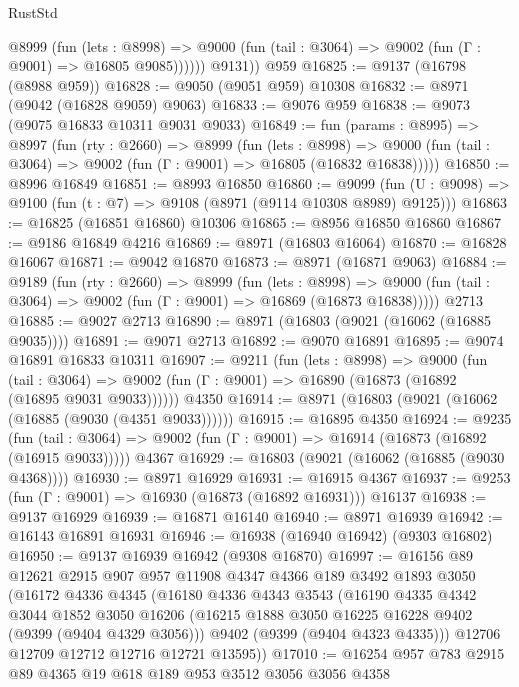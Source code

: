 \begin{lexlean}{RustStd}
\begin{coremodule}
            @8999
              (fun (lets : @8998) =>
              @9000 (fun (tail : @3064) => @9002 (fun (Γ : @9001) => @16805 @9085))))))
        @9131))
    @959
@16825 := @9137 (@16798 (@8988 @959))
@16828 := @9050 (@9051 @959) @10308
@16832 := @8971 (@9042 (@16828 @9059) @9063)
@16833 := @9076 @959
@16838 := @9073 (@9075 @16833 @10311 @9031 @9033)
@16849 := fun (params : @8995) =>
  @8997
    (fun (rty : @2660) =>
    @8999
      (fun (lets : @8998) =>
      @9000 (fun (tail : @3064) => @9002 (fun (Γ : @9001) => @16805 (@16832 @16838)))))
@16850 := @8996 @16849
@16851 := @8993 @16850
@16860 := @9099
    (fun (U : @9098) => @9100 (fun (t : @7) => @9108 (@8971 (@9114 @10308 @8989) @9125)))
@16863 := @16825 (@16851 @16860) @10306
@16865 := @8956 @16850 @16860
@16867 := @9186 @16849 @4216
@16869 := @8971 (@16803 @16064)
@16870 := @16828 @16067
@16871 := @9042 @16870
@16873 := @8971 (@16871 @9063)
@16884 := @9189
    (fun (rty : @2660) =>
    @8999
      (fun (lets : @8998) =>
      @9000 (fun (tail : @3064) => @9002 (fun (Γ : @9001) => @16869 (@16873 @16838)))))
    @2713
@16885 := @9027 @2713
@16890 := @8971 (@16803 (@9021 (@16062 (@16885 @9035))))
@16891 := @9071 @2713
@16892 := @9070 @16891
@16895 := @9074 @16891 @16833 @10311
@16907 := @9211
    (fun (lets : @8998) =>
    @9000
      (fun (tail : @3064) =>
      @9002 (fun (Γ : @9001) => @16890 (@16873 (@16892 (@16895 @9031 @9033))))))
    @4350
@16914 := @8971 (@16803 (@9021 (@16062 (@16885 (@9030 (@4351 @9033))))))
@16915 := @16895 @4350
@16924 := @9235
    (fun (tail : @3064) => @9002 (fun (Γ : @9001) => @16914 (@16873 (@16892 (@16915 @9033)))))
    @4367
@16929 := @16803 (@9021 (@16062 (@16885 (@9030 @4368))))
@16930 := @8971 @16929
@16931 := @16915 @4367
@16937 := @9253 (fun (Γ : @9001) => @16930 (@16873 (@16892 @16931))) @16137
@16938 := @9137 @16929
@16939 := @16871 @16140
@16940 := @8971 @16939
@16942 := @16143 @16891 @16931
@16946 := @16938 (@16940 @16942) (@9303 @16802)
@16950 := @9137 @16939 @16942 (@9308 @16870)
@16997 := @16156
    @89
    @12621
    @2915
    @907
    @957
    @11908
    @4347
    @4366
    @189
    @3492
    @1893
    @3050
    (@16172
      @4336
      @4345
      (@16180
        @4336
        @4343
        @3543
        (@16190
          @4335
          @4342
          @3044
          @1852
          @3050
          @16206
          (@16215 @1888 @3050 @16225 @16228 @9402 (@9399 (@9404 @4329 @3056)))
          @9402
          (@9399 (@9404 @4323 @4335)))
        @12706
        @12709
        @12712
        @12716
        @12721
        @13595))
@17010 := @16254 @957 @783 @2915 @89 @4365 @19 @618 @189 @953 @3512 @3056 @3056 @4358

\end{coremodule}
\end{lexlean}
